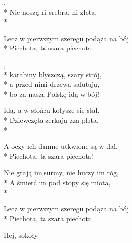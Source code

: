 \begin{lyrics}[longestline={Nie noszą lampasów, lecz szary ich strój,}]

,\\*
Nie noszą ni srebra, ni złota.\\*
\begin{markverses}%
Lecz w pierwszym szeregu podąża na bój\\*
Piechota, ta szara piechota.
\end{markverses}

\begin{chorus}
,\\*
karabiny błyszczą, szary strój,\\*
a przed nimi drzewa salutują,\\*
bo za naszą Polskę idą w bój!
\end{chorus}

Idą, a w słońcu kołysze się stal.\\*
Dziewczęta zerkają zza plota,\\*
\begin{markverses}%
A oczy ich dumne utkwione są w dal,\\*
Piechota, ta szara piechota!
\end{markverses}

\chorusref

Nie grają im surmy, nie huczy im róg,\\*
A śmierć im pod stopy się miota,\\*
\begin{markverses}%
Lecz w pierwszym szeregu podąża na bój\\*
Piechota, ta szara piechota.
\end{markverses}

\chorusref
\end{lyrics}



\song
{Hej, sokoły}

